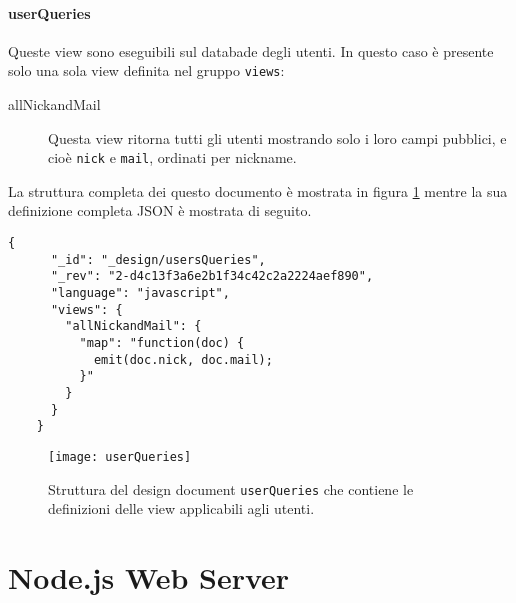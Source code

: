                 \paragraph{userQueries} Queste view sono eseguibili sul 
                databade degli utenti. In questo caso è presente solo una sola 
                view definita nel gruppo \texttt{views}:
                \begin{description}
                    \item[allNickandMail] Questa view ritorna tutti gli utenti 
                    mostrando solo i loro campi pubblici, e cioè \texttt{nick} 
                    e \texttt{mail}, ordinati per nickname.
                \end{description}
                La struttura completa dei questo documento è mostrata in 
                figura \ref{fig:userQueries} mentre la sua definizione completa 
                JSON è mostrata di seguito.
                \begin{lstlisting}[language=plane] 
    {
      "_id": "_design/usersQueries",
      "_rev": "2-d4c13f3a6e2b1f34c42c2a2224aef890",
      "language": "javascript",
      "views": {
        "allNickandMail": {
          "map": "function(doc) {
            emit(doc.nick, doc.mail);
          }"
        }
      }
    }
                \end{lstlisting}
                \begin{figure}[H]
                    \centering
                    \texttt{[image: userQueries]}
                    \caption{
                        Struttura del design document \texttt{userQueries} che 
                        contiene le definizioni delle view applicabili agli 
                        utenti.
                    }
                    \label{fig:userQueries}
                \end{figure}
    
    
    \section{Node.js Web Server}
        
